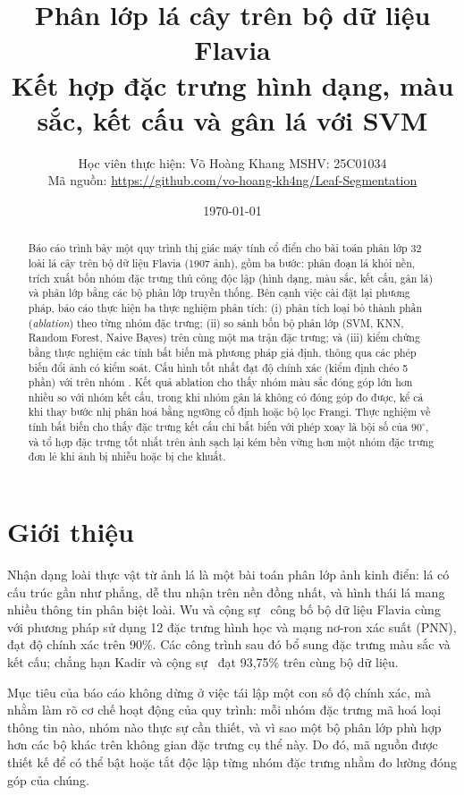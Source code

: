 \documentclass[11pt,a4paper]{article}
\title{\vspace{-1.5cm}Phân lớp lá cây trên bộ dữ liệu Flavia\\
\large Kết hợp đặc trưng hình dạng, màu sắc, kết cấu và gân lá với SVM}
\author{Học viên thực hiện: Võ Hoàng Khang \quad MSHV: 25C01034\\[0.3em]
\small Mã nguồn: \url{https://github.com/vo-hoang-kh4ng/Leaf-Segmentation}}
\date{\today}
\begin{document}
\maketitle
\vspace{-0.8cm}

\begin{abstract}
\noindent
Báo cáo trình bày một quy trình thị giác máy tính cổ điển cho bài toán phân lớp 32 loài lá cây
trên bộ dữ liệu Flavia (1907 ảnh), gồm ba bước: phân đoạn lá khỏi nền, trích xuất bốn nhóm đặc
trưng thủ công độc lập (hình dạng, màu sắc, kết cấu, gân lá) và phân lớp bằng các bộ phân lớp
truyền thống. Bên cạnh việc cài đặt lại phương pháp, báo cáo thực hiện ba thực nghiệm phân tích:
(i) phân tích loại bỏ thành phần (\emph{ablation}) theo từng nhóm đặc trưng; (ii) so sánh bốn bộ
phân lớp (SVM, KNN, Random Forest, Naive Bayes) trên cùng một ma trận đặc trưng; và (iii) kiểm chứng
bằng thực nghiệm các tính bất biến mà phương pháp giả định, thông qua các phép biến đổi ảnh có kiểm
soát. Cấu hình tốt nhất đạt độ chính xác \bestacc{} (kiểm định chéo 5 phần) với \bestmodel{} trên
nhóm \emph{\bestfeatures{}}. Kết quả ablation cho thấy nhóm màu sắc đóng góp lớn hơn nhiều so với
nhóm kết cấu, trong khi nhóm gân lá không có đóng góp đo được, kể cả khi thay bước nhị phân hoá
bằng ngưỡng cố định hoặc bộ lọc Frangi. Thực nghiệm về tính bất biến cho thấy đặc trưng kết cấu
chỉ bất biến với phép xoay là bội số của $90^\circ$, và tổ hợp đặc trưng tốt nhất trên ảnh sạch lại
kém bền vững hơn một nhóm đặc trưng đơn lẻ khi ảnh bị nhiễu hoặc bị che khuất.
\end{abstract}

\section{Giới thiệu}

Nhận dạng loài thực vật từ ảnh lá là một bài toán phân lớp ảnh kinh điển: lá có cấu trúc gần như
phẳng, dễ thu nhận trên nền đồng nhất, và hình thái lá mang nhiều thông tin phân biệt loài. Wu và
cộng sự~\cite{wu2007} công bố bộ dữ liệu Flavia cùng với phương pháp sử dụng 12 đặc trưng hình học
và mạng nơ-ron xác suất (PNN), đạt độ chính xác trên 90\%. Các công trình sau đó bổ sung đặc trưng
màu sắc và kết cấu; chẳng hạn Kadir và cộng sự~\cite{kadir2011} đạt 93,75\% trên cùng bộ dữ liệu.

Mục tiêu của báo cáo không dừng ở việc tái lập một con số độ chính xác, mà nhằm làm rõ cơ chế hoạt
động của quy trình: mỗi nhóm đặc trưng mã hoá loại thông tin nào, nhóm nào thực sự cần thiết, và vì
sao một bộ phân lớp phù hợp hơn các bộ khác trên không gian đặc trưng cụ thể này. Do đó, mã nguồn
được thiết kế để có thể bật hoặc tắt độc lập từng nhóm đặc trưng nhằm đo lường đóng góp của chúng.
\end{document}
